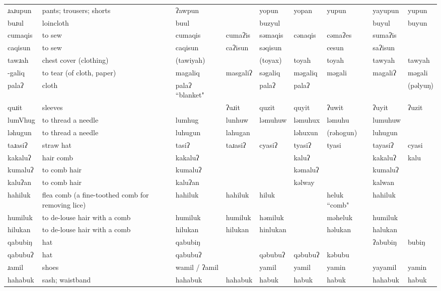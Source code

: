 \begin{landscape}
\begin{longtable}{*{9}{p{}}}
\text{*}ɹaɹupun & pants; trousers; shorts & ʔawpun &  & yopun & yopan & yupun & yayupun & yupun\\
\text{*}buɹul & loincloth & buul &  & buzyul &  &  & buyul & buyun\\
\text{*}cumaqis & to sew & cumaqis & cumaʔis & səmaqis & cənaqis & cəmaʔes & sumaʔis & \\
\text{*}caqisun & to sew & caqisun & caʔisun & səqisun &  & cesun & saʔisun & \\
\text{*}tawɹah & chest cover (clothing) & (tawiyah) &  & (toyax) & toyah & toyah & tawyah & tawyah\\
\text{*}-galiq & to tear (of cloth, paper) & magaliq & masgaliʔ & səgaliq & məgaliq & məgali & magaliʔ & məgali\\
\text{*}palaʔ & cloth & palaʔ ``blanket" &  & palaʔ & palaʔ &  &  & (pəlyuŋ)\\
\text{*}quɹit & sleeves &  & ʔuɹit & quzit & quyit & ʔuwit & ʔuyit & ʔuzit\\
\text{*}lumVhug & to thread a needle & lumhug & lunhuw & ləmuhuw & ləmuhux & ləmuhu & lumuhuw & \\
\text{*}ləhugun & to thread a needle & luhugun & lahugan &  & ləhuxun & (rəhogun) & luhugun & \\
\text{*}taɹasiʔ & straw hat & tasiʔ & taɹasiʔ & cyasiʔ & tyasiʔ & tyasi & tayasiʔ & cyasi\\
\text{*}kakaluʔ & hair comb & kakaluʔ &  &  & kaluʔ &  & kakaluʔ & kalu\\
\text{*}kumaluʔ & to comb hair & kumaluʔ &  &  & kəmaluʔ &  & kumaluʔ & \\
\text{*}kaluʔan & to comb hair & kaluʔan &  &  & kəlway &  & kalwan & \\
\text{*}hahiluk & flea comb (a fine-toothed comb for removing lice) & hahiluk & hahiluk & hiluk &  & heluk ``comb" & hahiluk & \\
\text{*}humiluk & to de-louse hair with a comb & humiluk & humiluk & həmiluk &  & məheluk & humiluk & \\
\text{*}hilukan & to de-louse hair with a comb & hilukan & hilukan & hinlukan &  & həlukan & halukan & \\
\text{*}qabubiŋ & hat & qabubiŋ &  &  &  &  & ʔabubiŋ & bubiŋ\\
\text{*}qabubuʔ & hat & qabubuʔ &  & qəbubuʔ & qəbubuʔ & kəbubu &  & \\
\text{*}ɹamil & shoes & wamil / ʔamil &  & yamil & yamil & yamin & yayamil & yamin\\
\text{*}hahabuk & sash; waistband & hahabuk & hahabuk & habuk & habuk & habuk & hahabuk & habuk\\

\end{longtable}
\end{landscape}
